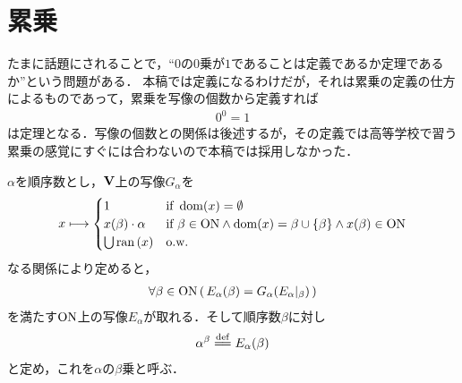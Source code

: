 \section{累乗}
	たまに話題にされることで，``$0$の$0$乗が$1$であることは定義であるか定理であるか''という問題がある．
	本稿では定義になるわけだが，それは累乗の定義の仕方によるものであって，累乗を写像の個数から定義すれば
	\begin{align}
		0^0 = 1
	\end{align}
	は定理となる．写像の個数との関係は後述するが，その定義では高等学校で習う累乗の感覚にすぐには合わないので本稿では採用しなかった．
	
	\begin{screen}
		\begin{dfn}[順序数の累乗]
			$\alpha$を順序数とし，$\mathbf{V}$上の写像$G_\alpha$を
			\begin{align}
				x \longmapsto 
				\begin{cases}
					1 & \mbox{if } \operatorname{dom}(x) = \emptyset \\
					x(\beta) \cdot \alpha & \mbox{if } \beta \in \mathrm{ON} \wedge \operatorname{dom}(x) = \beta \cup \{\beta\} 
					\wedge x(\beta) \in \mathrm{ON} \\
					\bigcup \operatorname*{ran} \left(x\right) & \mbox{o.w.}
				\end{cases}
			\end{align}
			なる関係により定めると，
			\begin{align}
				\forall \beta \in \mathrm{ON}\, (\, E_\alpha(\beta) = G_\alpha(E_\alpha|_\beta)\, )
			\end{align}
			を満たす$\mathrm{ON}$上の写像$E_\alpha$が取れる．そして順序数$\beta$に対し
			\begin{align}
				\alpha^\beta \defeq E_\alpha(\beta)
			\end{align}
			と定め，これを$\alpha$の$\beta$乗と呼ぶ．
		\end{dfn}
	\end{screen}
	